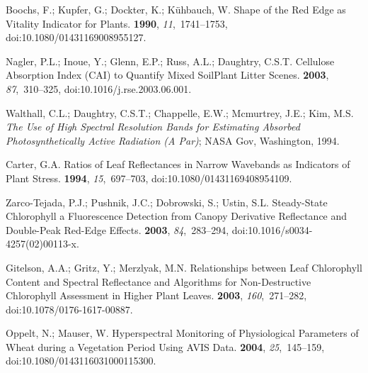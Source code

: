 \documentclass[remotesensing,article,accept,moreauthors,pdftex]{Definitions/mdpi}
\begin{document}
\begin{thebibliography}{999}
Boochs, F.; Kupfer, G.; Dockter, K.; K{\"u}hbauch, W.
\newblock Shape of the Red Edge as Vitality Indicator for Plants.
 {\bf 1990}, {\em
  11},~1741--1753, doi:10.1080/01431169008955127.

Nagler, P.L.; Inoue, Y.; Glenn, E.P.; Russ, A.L.; Daughtry, C.S.T.
\newblock Cellulose Absorption Index ({{CAI}}) to Quantify Mixed
  Soil\textendash Plant Litter Scenes.
 {\bf 2003}, {\em 87},~310--325, doi:10.1016/j.rse.2003.06.001.

Walthall, C.L.; Daughtry, C.S.T.; Chappelle, E.W.; Mcmurtrey, J.E.; Kim, M.S.
\newblock \emph{The {{Use}} of {{High Spectral Resolution Bands}} for {{Estimating
  Absorbed Photosynthetically Active Radiation}} ({{A Par}})}; NASA Gov, Washington, { 1994}.

Carter, G.A.
\newblock Ratios of Leaf Reflectances in Narrow Wavebands as Indicators of
  Plant Stress.
 {\bf 1994}, {\em
  15},~697--703, doi:10.1080/01431169408954109.

{Zarco-Tejada}, P.J.; Pushnik, J.C.; Dobrowski, S.; Ustin, S.L.
\newblock Steady-State Chlorophyll a Fluorescence Detection from Canopy
  Derivative Reflectance and Double-Peak Red-Edge Effects.
 {\bf 2003}, {\em 84},~283--294, doi:10.1016/s0034-4257(02)00113-x.

Gitelson, A.A.; Gritz, Y.; Merzlyak, M.N.
\newblock Relationships between Leaf Chlorophyll Content and Spectral
  Reflectance and Algorithms for Non-Destructive Chlorophyll Assessment in
  Higher Plant Leaves.
 {\bf 2003}, {\em 160},~271--282, doi:10.1078/0176-1617-00887.

Oppelt, N.; Mauser, W.
\newblock Hyperspectral Monitoring of Physiological Parameters of Wheat during
  a Vegetation Period Using {{AVIS}} Data.
 {\bf 2004}, {\em
  25},~145--159, doi:10.1080/0143116031000115300.


\end{thebibliography}
\end{document}
